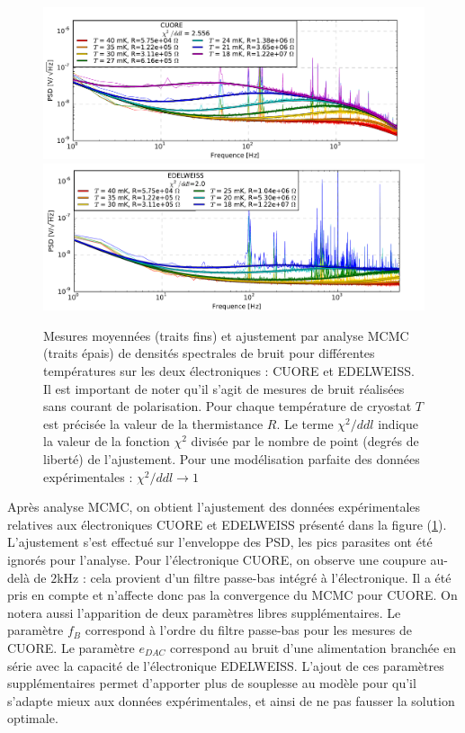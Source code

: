 \begin{figure}[!ht]
\begin{center}
\includegraphics[width=\textwidth]{Images/cuore_fit_fin.pdf}
\includegraphics[width=\textwidth]{Images/edel_fit_fin.pdf}
\end{center}
\caption{Mesures moyennées (traits fins) et ajustement par analyse MCMC (traits épais) de densités spectrales de bruit pour différentes températures sur les deux électroniques : CUORE et EDELWEISS. Il est important de noter qu'il s'agit de mesures de bruit réalisées sans courant de polarisation. Pour chaque température de cryostat $T$ est précisée la valeur de la thermistance $R$. Le terme $\chi^2/ddl$ indique la valeur de la fonction $\chi^2$ divisée par le nombre de point (degrés de liberté) de l'ajustement. Pour une modélisation parfaite des données expérimentales : $\chi^2/ddl \rightarrow 1$}
\label{rainbow-plot}
\end{figure}

Après analyse MCMC, on obtient l'ajustement des données expérimentales relatives aux électroniques CUORE et EDELWEISS présenté dans la figure (\ref{rainbow-plot}). L'ajustement s'est effectué sur l'enveloppe des PSD, les pics parasites ont été ignorés pour l'analyse. Pour l'électronique CUORE, on observe une coupure au-delà de $2$kHz : cela provient d'un filtre passe-bas intégré à l'électronique. Il a été pris en compte et n'affecte donc pas la convergence du MCMC pour CUORE. On notera aussi l'apparition de deux paramètres libres supplémentaires. Le paramètre $f_B$ correspond à l'ordre du filtre passe-bas pour les mesures de CUORE. Le paramètre $e_{DAC}$ correspond au bruit d'une alimentation branchée en série avec la capacité de l'électronique EDELWEISS. L'ajout de ces paramètres supplémentaires permet d'apporter plus de souplesse au modèle pour qu'il s'adapte mieux aux données expérimentales, et ainsi de ne pas fausser la solution optimale.

